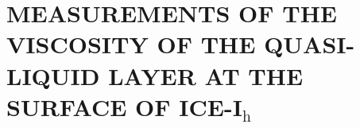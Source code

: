 \chapter{MEASUREMENTS OF THE VISCOSITY OF THE QUASI-LIQUID LAYER AT THE SURFACE OF ICE-I$_\mathrm{h}$}




